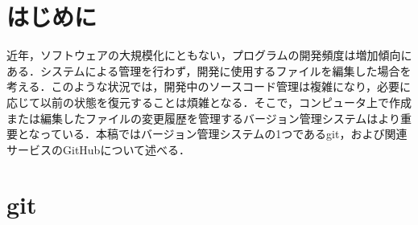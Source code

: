 \documentclass[a4j,9pt,twocolumn]{jsarticle}
\begin{document}


\section{はじめに}
近年，ソフトウェアの大規模化にともない，プログラムの開発頻度は増加傾向にある．システムによる管理を行わず，開発に使用するファイルを編集した場合を考える．このような状況では，開発中のソースコード管理は複雑になり，必要に応じて以前の状態を復元することは煩雑となる．そこで，コンピュータ上で作成または編集したファイルの変更履歴を管理するバージョン管理システムはより重要となっている．本稿ではバージョン管理システムの1つであるgit，および関連サービスのGitHubについて述べる．

\section{git}
\end{document}
